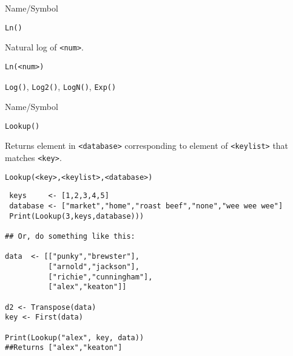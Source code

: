 \rl


\begin{desc}{Name/Symbol}
\item[Name/Symbol]	\verb+Ln()+

\item[Description]	Natural log of \verb+<num>+.

\item[Usage]		
\begin{verbatim}
Ln(<num>)
\end{verbatim}

\item[Example]	

\item[See Also]	\verb+Log()+, \verb+Log2()+, \verb+LogN()+, \verb+Exp()+     
\end{desc}

\rl






\begin{desc}{Name/Symbol}
\item[Name/Symbol]	\verb+Lookup()+

\item[Description] Returns
element in \verb+<database>+ corresponding to element of
\verb+<keylist>+ that matches \verb+<key>+.

\item[Usage]		
\begin{verbatim}
Lookup(<key>,<keylist>,<database>)
\end{verbatim}

\item[Example]	

\begin{verbatim}
 keys     <- [1,2,3,4,5]
 database <- ["market","home","roast beef","none","wee wee wee"]
 Print(Lookup(3,keys,database))) 

## Or, do something like this:
  
data  <- [["punky","brewster"],
          ["arnold","jackson"],
          ["richie","cunningham"],
          ["alex","keaton"]]

d2 <- Transpose(data)
key <- First(data)

Print(Lookup("alex", key, data))
##Returns ["alex","keaton"]
\end{verbatim}
\item[See Also]	
\end{desc}

\rl


